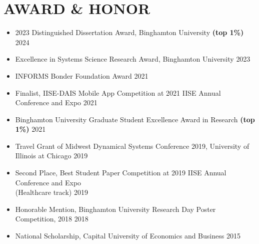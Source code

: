 \documentclass[10pt]{article}
\begin{document}
\section*{AWARD \& HONOR}
\vspace{-0.5em}
\begin{itemize}
	\setlength\itemsep{0.5pt}
	\item 2023 Distinguished Dissertation Award, Binghamton University \textbf{(top 1\%)}
	\hfill{2024}
    \item Excellence in Systems Science Research Award, Binghamton University
	\hfill{2023}
	\item INFORMS Bonder Foundation Award
	\hfill{2021}
	\item Finalist, IISE-DAIS Mobile App Competition at 2021 IISE Annual Conference and Expo
	\hfill{2021}
	\item Binghamton University Graduate Student Excellence Award in Research \textbf{(top 1\%)}
	\hfill{2021}
	\item Travel Grant of Midwest Dynamical Systems Conference 2019, University of Illinois at Chicago 
	\hfill{2019}
	\item Second Place, Best Student Paper Competition at 2019 IISE Annual Conference and Expo \\(Healthcare track)
	\hfill{2019}
	\item Honorable Mention, Binghamton University Research Day Poster Competition, 2018
	\hfill{2018}
	\item National Scholarship, Capital University of Economics and Business
	\hfill{2015}
\end{itemize}

\vspace{-1.5em}
\end{document}
